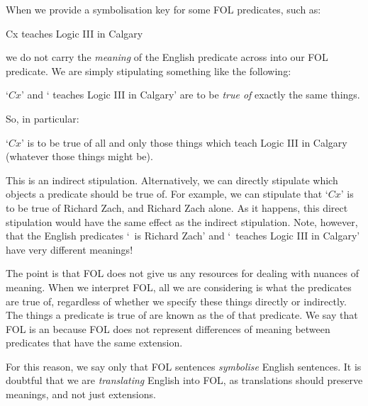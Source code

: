 When we provide a symbolisation key for some FOL predicates, such as:
	\begin{ekey}
		\item[Cx]  teaches Logic III in Calgary
	\end{ekey} 
we do not carry the \emph{meaning} of the English predicate across into our FOL predicate. We are simply stipulating something like the following:
	\begin{ebullet}
		\item `$Cx$' and ` teaches Logic III in Calgary' are to be \emph{true of} exactly the same things. 
	\end{ebullet}
So, in particular:
	\begin{ebullet}
		\item `$Cx$' is to be true of all and only those things which teach Logic III in Calgary (whatever those things might be).
	\end{ebullet}
This is an indirect stipulation. Alternatively, we can directly stipulate which objects a predicate should be true of. For example, we can stipulate that `$Cx$' is to be true of Richard Zach, and Richard Zach alone. As it happens, this direct stipulation would have the same effect as the indirect stipulation. Note, however, that the English predicates `\blank\ is Richard Zach' and `\blank\ teaches Logic III in Calgary' have very different meanings!

The point is that FOL does not give us any resources for dealing with nuances of meaning. When we interpret FOL, all we are considering is what the predicates are true of, regardless of whether we specify these things directly or indirectly. The things a predicate is true of are known as the  of that predicate. We say that FOL is an  because FOL does not represent differences of meaning between predicates that have the same extension.    

For this reason, we say only that FOL sentences \emph{symbolise} English sentences. It is doubtful that we are \emph{translating} English into FOL, as translations should preserve meanings, and not just extensions.

